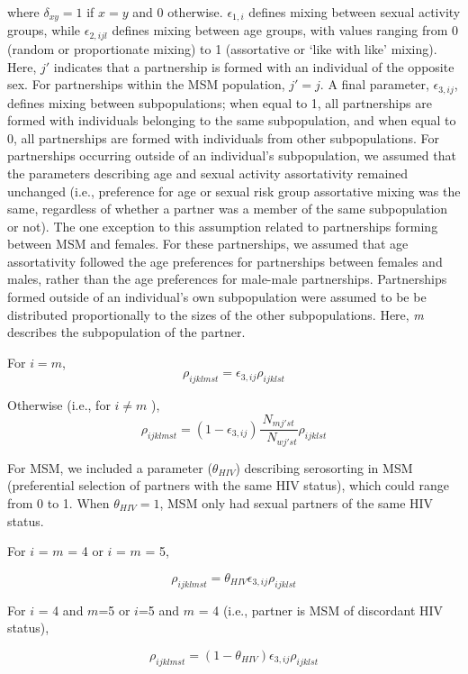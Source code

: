 \documentclass[a4paper]{article}
\begin{document}
where \(\delta_{xy} = 1\) if \(x=y\) and 0 otherwise. $\epsilon_{1,i}$ defines mixing between sexual activity groups, while $\epsilon_{2,ijl}$ defines mixing between age groups, with values ranging from 0 (random or proportionate mixing) to 1 (assortative or `like with like' mixing). Here, $j'$ indicates that a partnership is formed with an individual of the opposite sex. For partnerships within the MSM population, $j'=j$. 
A final parameter, $\epsilon_{3,ij}$, defines mixing between subpopulations; when equal to 1, all partnerships are formed with individuals belonging to the same subpopulation, and when equal to 0, all partnerships are formed with individuals from other subpopulations. For partnerships occurring outside of an individual's subpopulation, we assumed that the parameters describing age and sexual activity assortativity remained unchanged (i.e., preference for age or sexual risk group assortative mixing was the same, regardless of whether a partner was a member of the same subpopulation or not). The one exception to this assumption related to partnerships forming between MSM and females. For these partnerships, we assumed that age assortativity followed the age preferences for partnerships between females and males, rather than the age preferences for male-male partnerships. Partnerships formed outside of an individual's own subpopulation were assumed to be be distributed proportionally to the sizes of the other subpopulations. Here, \textit{m} describes the subpopulation of the partner.\bigskip

For \(i=m\),
\\
\[\rho_{ijklmst} = \epsilon_{3,ij} \rho_{ijklst}\] \bigskip

Otherwise (i.e., for \(i \ne m\) ),
\[\rho_{ijklmst} = (1- \epsilon_{3,ij})\frac{N_{mj'st}}{\mathop{\sum\limits_{w,w\ne i}^5} N_{wj'st}} \rho_{ijklst}\]

For MSM, we included a parameter ($\theta_{HIV}$) describing serosorting in MSM (preferential selection of partners with the same HIV status), which could range from 0 to 1. When $\theta_{HIV} = 1$, MSM only had sexual partners of the same HIV status.  

For $i$ = $m$ = 4 or $i$ = $m$ = 5, 

\[\rho_{ijklmst} = \theta_{HIV} \epsilon_{3, ij} \rho_{ijklst}\]

For $i$ = 4 and $m$=5 or $i$=5 and $m$ = 4 (i.e., partner is MSM of discordant HIV status), 

\[\rho_{ijklmst} = (1 - \theta_{HIV}) \epsilon_{3, ij} \rho_{ijklst}\] \bigskip
\end{document}
